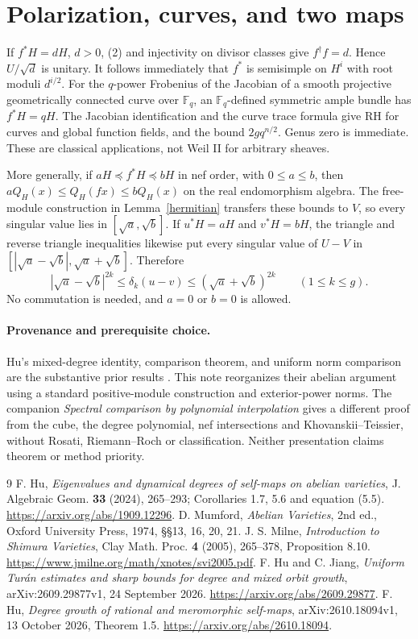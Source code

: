 \documentclass[11pt]{article}
\theoremstyle{remark}\newtheorem{remark}[theorem]{Remark}
\begin{document}
\section{Polarization, curves, and two maps}
If $f^*H=dH$, $d>0$, (2) and injectivity on divisor classes give
$f^\dagger f=d$. Hence $U/\sqrt d$ is unitary. It follows immediately
that $f^*$ is semisimple on $H^i$ with root moduli $d^{i/2}$.
For the $q$-power Frobenius of the Jacobian of a smooth projective
geometrically connected curve over $\mathbb F_q$, an
$\mathbb F_q$-defined symmetric ample bundle has $f^*H=qH$.
The Jacobian identification and the curve trace formula give RH for
curves and global function fields, and the bound $2gq^{n/2}$.
Genus zero is immediate. These are classical applications, not Weil II
for arbitrary sheaves.

More generally, if $aH\preceq f^*H\preceq bH$ in nef order, with
$0\le a\le b$, then
$aQ_H(x)\le Q_H(fx)\le bQ_H(x)$ on the real endomorphism algebra.
The free-module construction in Lemma~\ref{hermitian} transfers these
bounds to $V$, so every singular value lies in $[\sqrt a,\sqrt b]$.
If $u^*H=aH$ and $v^*H=bH$, the triangle and reverse triangle
inequalities likewise put every singular value of $U-V$ in
$[|\sqrt a-\sqrt b|,\sqrt a+\sqrt b]$. Therefore
\[
 |\sqrt a-\sqrt b|^{2k}\le\delta_k(u-v)
 \le(\sqrt a+\sqrt b)^{2k} \qquad(1\le k\le g).
 \tag{10}
\]
No commutation is needed, and $a=0$ or $b=0$ is allowed.

\paragraph{Provenance and prerequisite choice.}
Hu's mixed-degree identity, comparison theorem, and uniform norm
comparison are the substantive prior results \cite{Hu}. This note
reorganizes their abelian argument using a standard positive-module
construction and exterior-power norms. The companion
\emph{Spectral comparison by polynomial interpolation} gives a different
proof from the cube, the degree polynomial, nef intersections and
Khovanskii--Teissier, without Rosati, Riemann--Roch or classification.
Neither presentation claims theorem or method priority.

\begin{thebibliography}{9}\small
{} F. Hu, \emph{Eigenvalues and dynamical degrees of self-maps
on abelian varieties}, J. Algebraic Geom. \textbf{33} (2024), 265--293;
Corollaries 1.7, 5.6 and equation (5.5).
\url{https://arxiv.org/abs/1909.12296}.
 D. Mumford, \emph{Abelian Varieties}, 2nd ed., Oxford
University Press, 1974, \S\S13, 16, 20, 21.
 J. S. Milne, \emph{Introduction to Shimura Varieties},
Clay Math. Proc. \textbf{4} (2005), 265--378, Proposition 8.10.
\url{https://www.jmilne.org/math/xnotes/svi2005.pdf}.
 F. Hu and C. Jiang, \emph{Uniform Tur\'an estimates and
sharp bounds for degree and mixed orbit growth}, arXiv:2609.29877v1,
24 September 2026. \url{https://arxiv.org/abs/2609.29877}.
 F. Hu, \emph{Degree growth of rational and meromorphic
self-maps}, arXiv:2610.18094v1, 13 October 2026, Theorem 1.5.
\url{https://arxiv.org/abs/2610.18094}.
\end{thebibliography}
\end{document}
